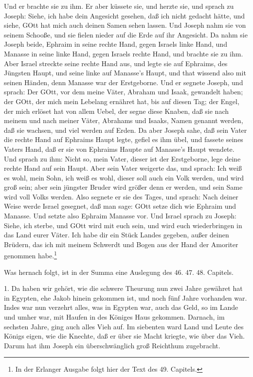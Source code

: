 \begin{schriftzitat}
Und er brachte sie zu ihm. Er aber küssete sie, und herzte sie, und sprach zu Joseph: Siehe, ich habe dein Angesicht gesehen, daß ich nicht gedacht hätte, und siehe, GOtt hat mich auch deinen Samen sehen lassen. Und Joseph nahm sie von seinem Schooße, und sie fielen nieder auf die Erde auf ihr Angesicht. Da nahm sie Joseph beide, Ephraim in seine rechte Hand, gegen Israels linke Hand, und Manasse in seine linke Hand, gegen Israels rechte Hand, und brachte sie zu ihm. Aber Israel streckte seine rechte Hand aus, und legte sie auf Ephraims, des Jüngsten Haupt, und seine linke auf Manasse’s Haupt, und that wissend also mit seinen Händen, denn Manasse war der Erstgeborne. Und er segnete Joseph, und sprach: Der GOtt, vor dem meine Väter, Abraham und Isaak, gewandelt haben; der GOtt, der mich mein Lebelang ernähret hat, bis auf diesen Tag; der Engel, der mich erlöset hat von allem Uebel, der segne diese Knaben, daß sie nach meinem und nach meiner Väter, Abrahams und Isaaks, Namen genannt werden, daß sie wachsen, und viel werden auf Erden. Da aber Joseph sahe, daß sein Vater die rechte Hand auf Ephraims Haupt legte, gefiel es ihm übel, und fassete seines Vaters Hand, daß er sie von Ephraims Haupte auf Manasse’s Haupt wendete. Und sprach zu ihm: Nicht so, mein Vater, dieser ist der Erstgeborne, lege deine rechte Hand auf sein Haupt. Aber sein Vater weigerte das, und sprach: Ich weiß es wohl, mein Sohn, ich weiß es wohl, dieser soll auch ein Volk werden, und wird groß sein; aber sein jüngster Bruder wird größer denn er werden, und sein Same wird voll Volks werden. Also segnete er sie des Tages, und sprach: Nach deiner Weise werde Israel gesegnet, daß man sage: GOtt setze dich wie Ephraim und Manasse. Und setzte also Ephraim Manasse vor. Und Israel sprach zu Joseph: Siehe, ich sterbe, und GOtt wird mit euch sein, und wird euch wiederbringen in das Land eurer Väter. Ich habe dir ein Stück Landes gegeben, außer deinen Brüdern, das ich mit meinem Schwerdt und Bogen aus der Hand der Amoriter genommen habe.\footnote{In der Erlanger Ausgabe folgt hier der Text des 49. Capitels.}

\end{schriftzitat}

Was hernach folgt, ist in der Summa eine Auslegung des 46. 47. 48. Capitels.

1. Da haben wir gehört, wie die schwere Theurung nun zwei Jahre gewähret hat in Egypten, ehe Jakob hinein gekommen ist, und noch fünf Jahre vorhanden war. Indes war nun verzehrt alles, was in Egypten war, auch das Geld, so im Lande und umher war, mit Haufen in des Königes Haus gekommen. Darnach, im sechsten Jahre, ging auch alles Vieh auf. Im siebenten ward Land und Leute des Königs eigen, wie die Knechte, daß er über sie Macht kriegte, wie über das Vieh. Darum hat ihm Joseph ein überschwänglich groß Reichthum zugebracht.

